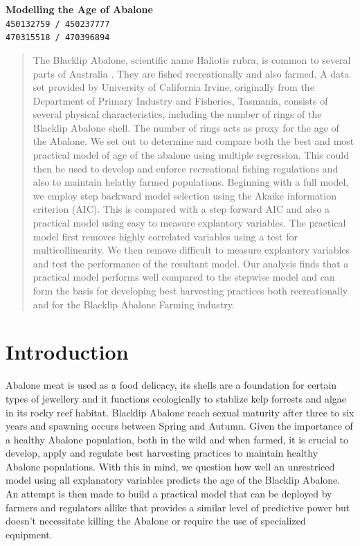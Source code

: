 \documentclass[9pt,twocolumn,margin=1mm]{article}
\begin{document}
	\begin{center}
		\textbf{\Large Modelling the Age of Abalone} \\\vspace{4mm}
		\texttt{450132759 / 450237777\\470315518 / 470396894}
	\end{center}
	\begin{abstract}
		The Blacklip Abalone, scientific name Haliotis rubra, is common to several parts of Australia \cite{source}. They are fished recreationally and also farmed. A data set provided by University of California Irvine, originally from the Department of Primary Industry and Fisheries, Tasmania, consists of several physical characteristics, including the number of rings of the Blacklip Abalone shell. The number of rings acts as proxy for the age of the Abalone. We set out to determine and compare both the best and most practical model of age of the abalone using multiple regression. This could then be used to develop and enforce recreational fishing regulations and also to maintain helathy farmed populations. Beginning with a full model, we employ step backward model selection using the Akaike information criterion (AIC). This is compared with a step forward AIC and also a practical model using easy to measure explantory variables. The practical model first removes highly correlated variables using a test for multicollinearity. We then remove difficult to measure explantory variables and test the performance of the resultant model. Our analysis finds that a practical model performs well compared to the stepwise model and can form the basis for developing best harvesting practices both recreationally and for the Blacklip Abalone Farming industry.
	\end{abstract}

	\section{Introduction}
		Abalone meat is used as a food delicacy, its shells are a foundation for certain types of jewellery and it functions ecologically to stablize kelp forrests and algae in its rocky reef habitat. Blacklip Abalone reach sexual maturity after three to six years and spawning occurs between Spring and Autumn\cite{blacklip}. Given the importance of a healthy Abalone population, both in the wild and when farmed, it is crucial to develop, apply and regulate best harvesting practices to maintain healthy Abalone populations. With this in mind, we question how well an unrestriced model using all explanatory variables predicts the age of the Blacklip Abalone. An attempt is then made to build a practical model that can be deployed by farmers and regulators allike that provides a similar level of predictive power but doesn't necessitate killing the Abalone or require the use of specialized equipment.					
\end{document}
